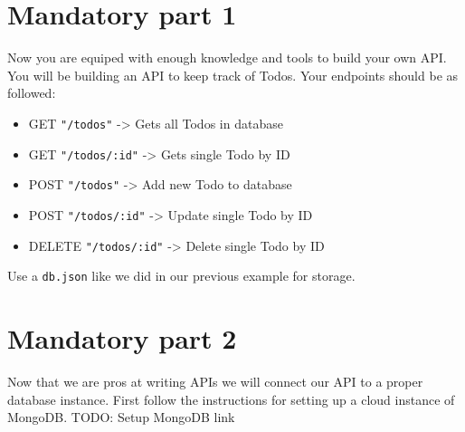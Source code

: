 \documentclass{42-en}
\begin{document}
\newpage
\nextexercice

\chapter{Mandatory part 1}

Now you are equiped with enough knowledge and tools to build your own API. You will be building an API to keep track of Todos. Your endpoints should be as followed:

\begin{itemize}\itemsep1pt
\item GET \texttt{"/todos"} -> Gets all Todos in database
\item GET \texttt{"/todos/:id"} -> Gets single Todo by ID
\item POST \texttt{"/todos"} -> Add new Todo to database
\item POST \texttt{"/todos/:id"} -> Update single Todo by ID
\item DELETE \texttt{"/todos/:id"} -> Delete single Todo by ID
\end{itemize}

Use a \texttt{db.json} like we did in our previous example for storage.


\chapter{Mandatory part 2}

Now that we are pros at writing APIs we will connect our API to a proper database instance. First follow the instructions for setting up a cloud instance of MongoDB.
TODO: Setup MongoDB link
\end{document}
